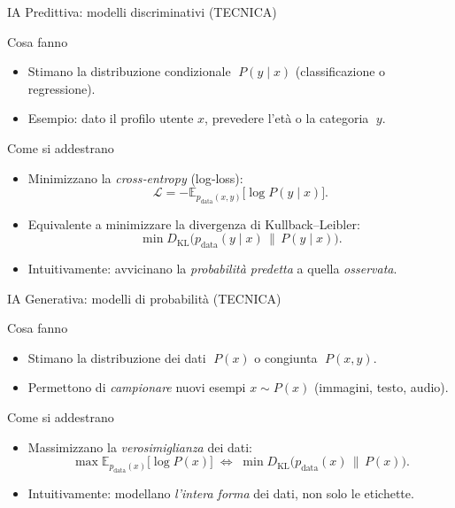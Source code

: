 \documentclass[12pt]{beamer}
\begin{document}
\begin{frame}{IA Predittiva: modelli discriminativi (TECNICA)}
\small
  \begin{alertblock}{Cosa fanno}
    \begin{itemize}
      \item Stimano la distribuzione condizionale \(\;P(y \mid x)\)\: (classificazione o regressione).
      \item Esempio: dato il profilo utente \(x\), prevedere l’età o la categoria \(\;y\).
    \end{itemize}
  \end{alertblock}
  \begin{alertblock}{Come si addestrano}
    \begin{itemize}
      \item Minimizzano la \emph{cross‐entropy} (log‐loss):
      \[
        \mathcal{L} = -\mathbb{E}_{p_{\mathrm{data}}(x,y)}\bigl[\log P(y\mid x)\bigr].
      \]
      \item Equivalente a minimizzare la divergenza di Kullback–Leibler:
      \[
        \min D_{\mathrm{KL}}\bigl(p_{\mathrm{data}}(y\mid x)\,\|\,P(y\mid x)\bigr).
      \]
      \item Intuitivamente: avvicinano la \emph{probabilità predetta} a quella \emph{osservata}.
    \end{itemize}
  \end{alertblock}
\end{frame}

\begin{frame}{IA Generativa: modelli di probabilità (TECNICA)}
\small
  \begin{alertblock}{Cosa fanno}
    \begin{itemize}
      \item Stimano la distribuzione dei dati \(\;P(x)\)\: o congiunta \(\;P(x,y)\).
      \item Permettono di \emph{campionare} nuovi esempi \(x\sim P(x)\) (immagini, testo, audio).
    \end{itemize}
  \end{alertblock}
  \begin{alertblock}{Come si addestrano}
    \begin{itemize}
      \item Massimizzano la \emph{verosimiglianza} dei dati:
      \[
        \max \mathbb{E}_{p_{\mathrm{data}}(x)}\bigl[\log P(x)\bigr]
        \;\Longleftrightarrow\;
        \min D_{\mathrm{KL}}\bigl(p_{\mathrm{data}}(x)\,\|\,P(x)\bigr).
      \]
      \item Intuitivamente: modellano \emph{l’intera forma} dei dati, non solo le etichette.
    \end{itemize}
  \end{alertblock}
\end{frame}
\end{document}
